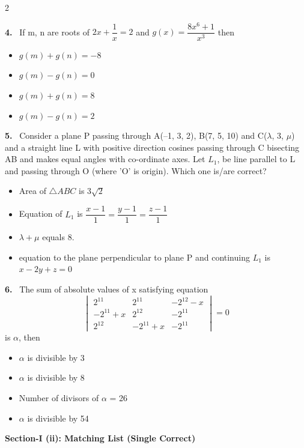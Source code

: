\documentclass[10pt]{extarticle}
\newcommand{\sect}[1]{\par\smallskip\noindent\textbf{#1}\par}
\newcommand{\qn}[1]{\par\smallskip\noindent\textbf{#1.}~}
\newenvironment{qoptions}{\begin{itemize}[leftmargin=1.8em,itemsep=1pt,topsep=2pt,label={}]}{\end{itemize}}
\newcommand{\opt}[2]{\item[(#1)] #2}
\begin{document}
\begin{multicols}{2}
\qn{4} If m, n are roots of $2x+\dfrac1x=2$ and $g(x)=\dfrac{8x^6+1}{x^3}$ then
\begin{qoptions}
\opt{A}{$g(m)+g(n)=-8$}
\opt{B}{$g(m)-g(n)=0$}
\opt{C}{$g(m)+g(n)=8$}
\opt{D}{$g(m)-g(n)=2$}
\end{qoptions}

\qn{5} Consider a plane P passing through A(--1, 3, 2), B(7, 5, 10) and C($\lambda$, 3, $\mu$) and a straight line L with positive direction cosines passing through C bisecting AB and makes equal angles with co-ordinate axes. Let $L_1$, be line parallel to L and passing through O (where 'O' is origin). Which one is/are correct?
\begin{qoptions}
\opt{A}{Area of $\triangle ABC$ is $3\sqrt2$}
\opt{B}{Equation of $L_1$ is $\dfrac{x-1}{1}=\dfrac{y-1}{1}=\dfrac{z-1}{1}$}
\opt{C}{$\lambda+\mu$ equals 8.}
\opt{D}{equation to the plane perpendicular to plane P and continuing $L_1$ is $x-2y+z=0$}
\end{qoptions}

\qn{6} The sum of absolute values of x satisfying equation
$$\begin{vmatrix}2^{11} & 2^{11} & -2^{12}-x\\ -2^{11}+x & 2^{12} & -2^{11}\\ 2^{12} & -2^{11}+x & -2^{11}\end{vmatrix}=0$$
is $\alpha$, then
\begin{qoptions}
\opt{A}{$\alpha$ is divisible by 3}
\opt{B}{$\alpha$ is divisible by 8}
\opt{C}{Number of divisors of $\alpha$ = 26}
\opt{D}{$\alpha$ is divisible by 54}
\end{qoptions}

\sect{Section-I (ii): Matching List (Single Correct)}


\end{multicols}
\end{document}
